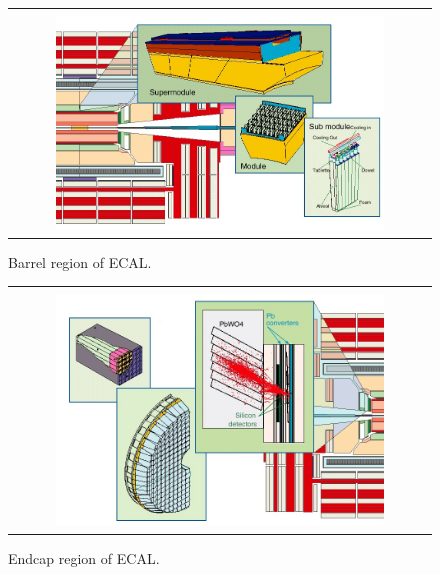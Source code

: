 %
\begin{figure}[h] 
\vspace{1cm}
\centering 
\begin{tabular}{|c|} 
\hline
\\
\includegraphics[width=0.8\textwidth]{figures/ecal_barrel.jpg} \\
\hline
\end{tabular} 
\caption{Barrel region of ECAL.}
\label{fig:ecal_EB} 
\end{figure} 
%
\begin{figure}[h] 
\vspace{1cm}
\centering 
\begin{tabular}{|c|} 
\hline
\\
\includegraphics[width=0.8\textwidth]{figures/ecal_endcap.jpg} \\
\hline
\end{tabular} 
\caption{Endcap region of ECAL.}
\label{fig:ecal_EE} 
\end{figure} 
%

